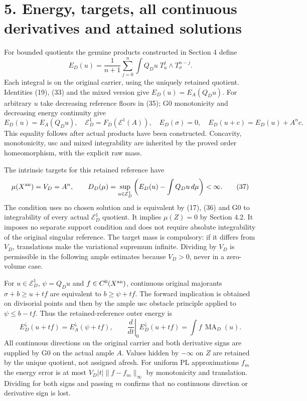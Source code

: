 \documentclass[
  10pt,
]{article}
\begin{document}
\section{5. Energy, targets, all continuous derivatives and attained
solutions}\label{energy-targets-all-continuous-derivatives-and-attained-solutions}

For bounded quotients the genuine products constructed in Section 4
define
\[E_D(u)=\frac1{n+1}\sum_{j=0}^n\int Q_Du\;T_u^j\wedge T_\sigma^{n-j}.\tag{35}\]
Each integral is on the original carrier, using the uniquely retained
quotient. Identities (19), (33) and the mixed version give
\(E_D(u)=E_A(Q_Du)\). For arbitrary \(u\) take decreasing reference
floors in (35); G0 monotonicity and decreasing energy continuity give
\[E_D(u)=E_A(Q_Du),\quad
\mathcal E_D^1=F_D(\mathcal E^1(A)),\quad E_D(\sigma)=0,
\quad E_D(u+c)=E_D(u)+A^n c.\tag{36}\] This equality follows after
actual products have been constructed. Concavity, monotonicity, usc and
mixed integrability are inherited by the proved order homeomorphism,
with the explicit raw mass.

The intrinsic targets for this retained reference have
\[\mu(X^{\rm an})=V_D=A^n,\qquad
D_D(\mu)=\sup_{u\in\mathcal E_D^1}\left(E_D(u)-\int Q_Du\,d\mu\right)<\infty.\tag{37}\]
The condition uses no chosen solution and is equivalent by (17), (36)
and G0 to integrability of every actual \(\mathcal E_D^1\) quotient. It
implies \(\mu(Z)=0\) by Section 4.2. It imposes no separate support
condition and does not require absolute integrability of the original
singular reference. The target mass is compulsory: if it differs from
\(V_D\), translations make the variational supremum infinite. Dividing
by \(V_D\) is permissible in the following ample estimates because
\(V_D>0\), never in a zero-volume case.

For \(u\in\mathcal E_D^1\), \(\psi=Q_Du\) and \(f\in C^0(X^{\rm an})\),
continuous original majorants \(\sigma+b\geq u+tf\) are equivalent to
\(b\geq\psi+tf\). The forward implication is obtained on divisorial
points and then by the ample usc obstacle principle applied to
\(\psi\leq b-tf\). Thus the retained-reference outer energy is
\[E_D^\downarrow(u+tf)=E_A^\downarrow(\psi+tf),\qquad
\left.\frac d{dt}\right|_{0}E_D^\downarrow(u+tf)
=\int f\,\operatorname{MA}_D(u).\tag{38}\] All continuous directions on
the original carrier and both derivative signs are supplied by G0 on the
actual ample \(A\). Values hidden by \(-\infty\) on \(Z\) are retained
by the unique quotient, not assigned afresh. For uniform PL
approximations \(f_m\) the energy error is at most
\(V_D|t|\|f-f_m\|_\infty\) by monotonicity and translation. Dividing for
both signs and passing \(m\) confirms that no continuous direction or
derivative sign is lost.
\end{document}
